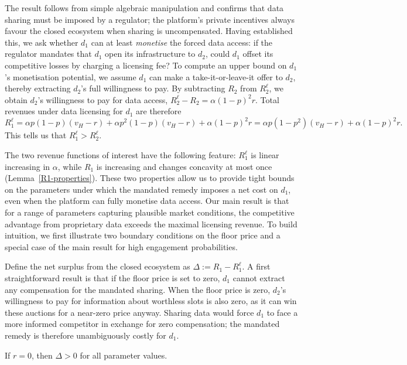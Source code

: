\noindent The result follows from simple algebraic manipulation and confirms that data sharing must be imposed by a regulator; the platform's private incentives always favour the closed ecosystem when sharing is uncompensated. Having established this, we ask whether $d_1$ can at least \textit{monetise} the forced data access: if the regulator mandates that $d_1$ open its infrastructure to $d_2$, could $d_1$ offset its competitive losses by charging a licensing fee? To compute an upper bound on $d_1$'s monetisation potential, we assume $d_1$ can make a take-it-or-leave-it offer to $d_2$, thereby extracting $d_2$'s full willingness to pay. By subtracting $R_2$ from $R_2^\ell$, we obtain $d_2$'s willingness to pay for data access, $R_2^\ell - R_2 = \alpha(1-p)^2r$. Total revenues under data licensing for $d_1$ are therefore
\begin{equation*}
     R_1^\ell = \alpha p (1-p)(v_H-r) + \alpha p^2 (1-p)(v_H-r) + \alpha(1-p)^2r = \alpha p (1-p^2)(v_H-r) + \alpha(1-p)^2r.
\end{equation*}
This tells us that $R_1^\ell > R_2^\ell$.

\noindent The two revenue functions of interest have the following feature: $R_1^\ell$ is linear increasing in $\alpha$, while $R_1$ is increasing and changes concavity at most once (Lemma~\ref{R1-properties}). These two properties allow us to provide tight bounds on the parameters under which the mandated remedy imposes a net cost on $d_1$, even when the platform can fully monetise data access. Our main result is that for a range of parameters capturing plausible market conditions, the competitive advantage from proprietary data exceeds the maximal licensing revenue. To build intuition, we first illustrate two boundary conditions on the floor price and a special case of the main result for high engagement probabilities. \par

\noindent Define the net surplus from the closed ecosystem as $\Delta := R_1 - R_1^\ell$. A first straightforward result is that if the floor price is set to zero, $d_1$ cannot extract any compensation for the mandated sharing. When the floor price is zero, $d_2$'s willingness to pay for information about worthless slots is also zero, as it can win these auctions for a near-zero price anyway. Sharing data would force $d_1$ to face a more informed competitor in exchange for zero compensation; the mandated remedy is therefore unambiguously costly for $d_1$.

\begin{cor}
    If $r=0$, then $\Delta>0$ for all parameter values.
\end{cor}

